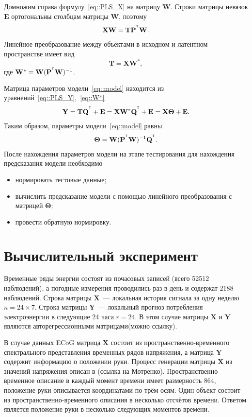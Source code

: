 \documentclass[12pt,twoside]{article}
\newcommand{\bY}{\mathbf{Y}}
\newcommand{\bX}{\mathbf{X}}
\newcommand{\bP}{\mathbf{P}}
\newcommand{\bT}{\mathbf{T}}
\newcommand{\bQ}{\mathbf{Q}}
\newcommand{\bE}{\mathbf{E}}
\newcommand{\bW}{\mathbf{W}}
\newcommand{\bTheta}{\boldsymbol{\Theta}}
\newcommand{\T}{^{\text{\tiny\sffamily\upshape\mdseries T}}}
\begin{document}
Домножим справа формулу~\eqref{eq::PLS_X} на матрицу $\bW$. Строки матрицы невязок $\bE$ ортогональны столбцам матрицы $\bW$, поэтому 
\[
	\bX \bW = \bT \bP^{\T} \bW.
\] 
Линейное преобразование между объектами в исходном и латентном пространстве имеет вид
\begin{equation}
	\bT = \bX \bW^*,
	\label{eq::W*}
\end{equation}
где $\bW^* = \bW (\bP^{\T} \bW)^{-1}$. 

Матрица параметров модели~\ref{eq::model} находится из уравнений~\eqref{eq::PLS_Y},~\eqref{eq::W*}
\begin{equation*}
    \bY = \bT \bQ^{\T} + \bE = \bX \bW^* \bQ^{\T} + \bE = \bX \bTheta + \bE.
\end{equation*}
Таким образом, параметры модели~\eqref{eq::model} равны
\begin{equation*}
    \bTheta = \bW (\bP^{\T} \bW)^{-1} \bQ^{\T}.
\end{equation*}
После нахождения параметров модели на этапе тестирования для нахождения предсказания модели необходимо
\begin{itemize}
	\item нормировать тестовые данные;	
	\item вычислить предсказание модели с помощью линейного преобразования с матрицей $\bTheta$;
	\item провести обратную нормировку.
\end{itemize}

\section{Вычислительный эксперимент}
Временные ряды энергии состоят из почасовых записей (всего 52512 наблюдений), а погодные измерения проводились раз в день и содержат 2188 наблюдений. 
Строка матрицы $\bX$~--– локальная история сигнала за одну неделю $n = 24 \times 7$. Строка матрицы $\bY$~--- локальный прогноз потребления электроэнергии в следующие 24 часа $r = 24$. В этом случае матрицы $\bX$ и $\bY$ являются авторегрессионными матрицами(можно ссылку).

В случае данных ECoG матрица $\bX$ состоит из пространственно-временного спектрального представления временных рядов напряжения, а матрица $\bY$ содержит информацию о положении руки. 
Процесс генерации матрицы $\bX$ из значений напряжения описан в (ссылка на Мотренко). 
Пространственно-временное описание в каждый момент времени имеет размерность $864$, положение руки описывается координатами по трём осям. 
Один объект состоит из пространственно-временного описания в несколько отсчётов времени. 
Ответом является положение руки в несколько следующих моментов времени.
\end{document}
